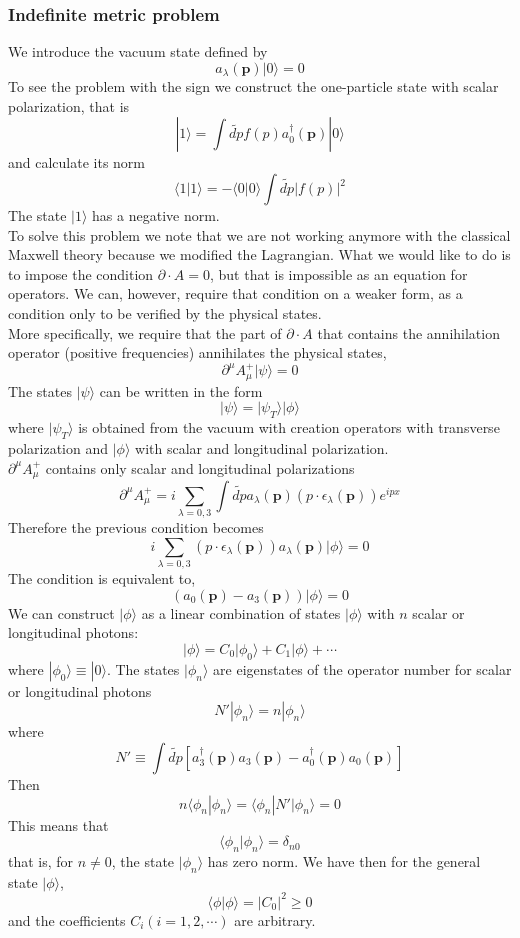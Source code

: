 \subsubsection{Indefinite metric problem}
We introduce the vacuum state defined by
\[a_{\lambda}(\bm{p}) | 0 \rangle = 0\]
To see the problem with the sign we construct the one-particle state with scalar polarization, that is
\[|1\rangle = \int \widetilde{dp} f(p) a^{\dagger}_{0}(\bm{p})|0\rangle
\]
and calculate its norm
\[\langle 1 | 1 \rangle = -\langle 0 | 0 \rangle \int \widetilde{dp} |f(p)|^2\]
The state $| 1 \rangle$ has a negative norm.
\\
To solve this problem we note that we are not working anymore with the classical Maxwell theory because we modified the Lagrangian. What we would like to do is to impose the condition $\partial \cdot A = 0$, but that is impossible as an equation for operators. We can, however, require that condition on a weaker form, as a condition only to be verified by the physical states.
\\
More specifically, we require that the part of $\partial \cdot A$ that contains the annihilation operator (positive frequencies) annihilates the physical states,
\[\partial^{\mu} A^{+}_{\mu} | \psi \rangle = 0\]
The states $| \psi \rangle$ can be written in the form
\[| \psi \rangle = | \psi_T \rangle | \phi \rangle\]
where $| \psi_T \rangle$  is obtained from the vacuum with creation operators with transverse polarization and $| \phi \rangle$ with scalar and longitudinal polarization.
\\
$\partial^{\mu} A^{+}_{\mu}$ contains only scalar and longitudinal polarizations
\[\partial^{\mu} A^{+}_{\mu} = i\sum_{\lambda=0,3} \int \widetilde{dp} a_{\lambda}(\bm{p}) (p \cdot \epsilon_{\lambda}(\bm{p}) ) e^{ipx} \]
Therefore the previous condition becomes
\[i\sum_{\lambda=0,3} (p \cdot \epsilon_{\lambda}(\bm{p})) a_{\lambda}(\bm{p})  | \phi \rangle = 0\]
The condition is equivalent to,
\[(a_{0}(\bm{p}) - a_{3}(\bm{p})) | \phi \rangle = 0\]
We can construct $| \phi \rangle$ as a linear combination of states $| \phi \rangle$ with $n$ scalar or longitudinal photons:
\[| \phi \rangle = C_0 | \phi_0 \rangle + C_1 | \phi \rangle + \cdots\]
where $| \phi_0 \rangle \equiv | 0 \rangle$.
The states $|\phi_n\rangle$ are eigenstates of the operator number for scalar or longitudinal photons
\[N' | \phi_n \rangle = n | \phi_n \rangle\]
where
\[N' \equiv \int \widetilde{dp} [a^{\dagger}_{3}(\bm{p})a_{3}(\bm{p})-a^{\dagger}_{0}(\bm{p})a_{0}(\bm{p})] \]
Then
\[n \langle \phi_n | \phi_n \rangle = \langle \phi_n |N'| \phi_n \rangle = 0\]
This means that
\[\langle \phi_n | \phi_n \rangle = \delta_{n0}\]
that is, for $n \neq 0$, the state $| \phi_n \rangle$ has zero norm. We have then for the general state $| \phi \rangle$,
\[\langle \phi | \phi \rangle = |C_0|^2 \geq 0\]
and the coefficients $C_i(i=1,2,\cdots)$ are arbitrary.

